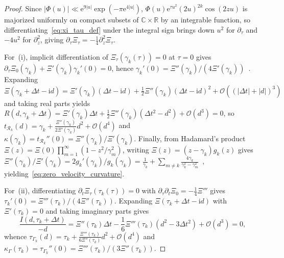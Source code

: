 \documentclass[11pt,reqno]{amsart}
\theoremstyle{plain}
\theoremstyle{definition}
\theoremstyle{remark}
\numberwithin{equation}{section}
\newcommand{\ii}{\mathrm{i}}
\newcommand{\ee}{\mathrm{e}}
\begin{document}
\begin{proof}
Since $\lvert\Phi(u)\rvert \ll \ee^{9\lvert u\rvert}\exp(-\pi\ee^{4\lvert u\rvert})$, $\Phi(u)\ee^{\tau u^2}(2u)^{2k}\cos(2zu)$ is majorized uniformly on compact subsets of $\mathbb{C} \times \mathbb{R}$ by an integrable function, so differentiating~\eqref{eq:xi_tau_def} under the integral sign brings down $u^2$ for $\partial_\tau$ and $-4u^2$ for $\partial_z^2$, giving $\partial_\tau\Xi_\tau = -\frac{1}{4}\partial_z^2\Xi_\tau$.

For~(i), implicit differentiation of $\Xi_\tau(\gamma_k(\tau)) = 0$ at $\tau = 0$ gives $\partial_\tau\Xi_0(\gamma_k) + \Xi'(\gamma_k)\gamma_k'(0) = 0$, hence $\gamma_k'(0) = \Xi''(\gamma_k)/(4\Xi'(\gamma_k))$~\cite{csordas1994,rodgerstao2020}. Expanding $\Xi(\gamma_k + \Delta t - \ii d) = \Xi'(\gamma_k)(\Delta t - \ii d) + \frac{1}{2}\Xi''(\gamma_k)(\Delta t - \ii d)^2 + \mathcal{O}((\lvert\Delta t\rvert + \lvert d\rvert)^3)$ and taking real parts yields $R(d, \gamma_k + \Delta t) = \Xi'(\gamma_k)\Delta t + \frac{1}{2}\Xi''(\gamma_k)(\Delta t^2 - d^2) + \mathcal{O}(d^3) = 0$, so $t_{\mathcal{R}_k}(d) = \gamma_k + \frac{\Xi''(\gamma_k)}{2\Xi'(\gamma_k)}d^2 + \mathcal{O}(d^4)$ and $\kappa(\gamma_k) = t_{\mathcal{R}_k}''(0) = \Xi''(\gamma_k)/\Xi'(\gamma_k)$. Finally, from Hadamard's product $\Xi(z) = \Xi(0)\prod_{m=1}^\infty(1 - z^2/\gamma_m^2)$, writing $\Xi(z) = (z - \gamma_k)g_k(z)$ gives $\Xi''(\gamma_k)/\Xi'(\gamma_k) = 2g_k'(\gamma_k)/g_k(\gamma_k) = \frac{1}{\gamma_k} + \sum_{m \neq k}\frac{4\gamma_k}{\gamma_k^2 - \gamma_m^2}$~\cite{csordas1994}, yielding~\eqref{eq:zero_velocity_curvature}.

For~(ii), differentiating $\partial_t\Xi_\tau(\tau_k(\tau)) = 0$ with $\partial_\tau\partial_t\Xi_0 = -\frac{1}{4}\Xi'''$ gives $\tau_k'(0) = \Xi'''(\tau_k)/(4\Xi''(\tau_k))$. Expanding $\Xi(\tau_k + \Delta t - \ii d)$ with $\Xi'(\tau_k) = 0$ and taking imaginary parts gives
\[
\frac{I(d, \tau_k + \Delta t)}{-d} = \Xi''(\tau_k)\Delta t - \frac{1}{6}\Xi'''(\tau_k)(d^2 - 3\Delta t^2) + \mathcal{O}(d^3) = 0,
\]
whence $\tau_{\Gamma_k}(d) = \tau_k + \frac{\Xi'''(\tau_k)}{6\Xi''(\tau_k)}d^2 + \mathcal{O}(d^4)$ and $\kappa_\Gamma(\tau_k) = \tau_{\Gamma_k}''(0) = \Xi'''(\tau_k)/(3\Xi''(\tau_k))$.
\end{proof}
\end{document}
